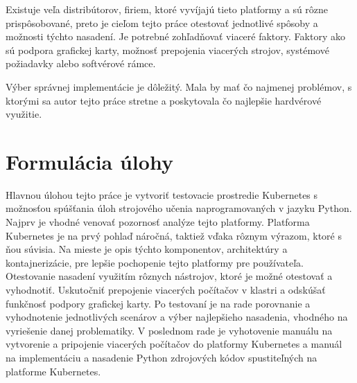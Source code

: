 Existuje veľa distribútorov, firiem, ktoré vyvíjajú tieto platformy a sú rôzne prispôsobované, preto je cieľom tejto práce otestovať jednotlivé spôsoby a možnosti týchto nasadení. Je potrebné zohľadňovať viaceré faktory. Faktory ako sú podpora grafickej karty, možnosť prepojenia viacerých strojov, systémové požiadavky alebo softvérové rámce.

Výber správnej implementácie je dôležitý. Mala by mať čo najmenej problémov, s ktorými sa autor tejto práce stretne a poskytovala čo najlepšie hardvérové využitie.

\section*{Formulácia úlohy}

Hlavnou úlohou tejto práce je vytvoriť testovacie prostredie Kubernetes s možnosťou spúšťania úloh strojového učenia naprogramovaných v jazyku Python. Najprv je vhodné venovať pozornosť analýze tejto platformy. Platforma Kubernetes je na prvý pohlaď náročná, taktiež vďaka rôznym výrazom, ktoré s ňou súvisia. Na mieste je opis týchto komponentov, architektúry a kontajnerizácie, pre lepšie pochopenie tejto platformy pre používateľa. Otestovanie nasadení využitím rôznych nástrojov, ktoré je možné otestovať a vyhodnotiť. Uskutočniť prepojenie viacerých počítačov v klastri a odskúšať funkčnosť podpory grafickej karty. Po testovaní je na rade porovnanie a vyhodnotenie jednotlivých scenárov a výber najlepšieho nasadenia, vhodného na vyriešenie danej problematiky. V poslednom rade je vyhotovenie manuálu na vytvorenie a pripojenie viacerých počítačov do platformy Kubernetes a manuál na implementáciu a nasadenie Python zdrojových kódov spustiteľných na platforme Kubernetes.